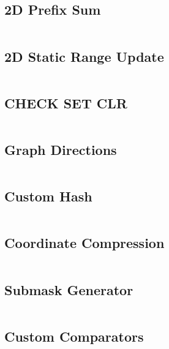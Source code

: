 \subsection{\small 2D Prefix Sum  \scriptsize}
\inputminted[breaklines, breakanywhere]{c++}{code/11-Misc./08-2D Prefix Sum.cpp}

\subsection{\small 2D Static Range Update  \scriptsize}
\inputminted[breaklines, breakanywhere]{c++}{code/11-Misc./09-2D Static Range Update.cpp}

\subsection{\small CHECK SET CLR  \scriptsize}
\inputminted[breaklines, breakanywhere]{c++}{code/11-Misc./10-CHECK SET CLR.cpp}

\subsection{\small Graph Directions  \scriptsize}
\inputminted[breaklines, breakanywhere]{c++}{code/11-Misc./11-Graph Directions.cpp}

\subsection{\small Custom Hash  \scriptsize}
\inputminted[breaklines, breakanywhere]{c++}{code/11-Misc./12-Custom Hash.cpp}

\subsection{\small Coordinate Compression  \scriptsize}
\inputminted[breaklines, breakanywhere]{c++}{code/11-Misc./13-Coordinate Compression.cpp}

\subsection{\small Submask Generator  \scriptsize}
\inputminted[breaklines, breakanywhere]{c++}{code/11-Misc./14-Submask Generator.cpp}

\subsection{\small Custom Comparators  \scriptsize}
\inputminted[breaklines, breakanywhere]{c++}{code/11-Misc./15-Custom Comparators.cpp}

